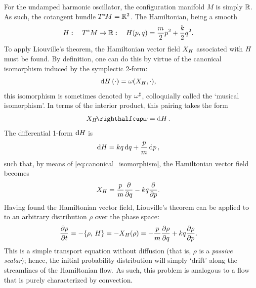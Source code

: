 For the undamped harmonic oscillator, the configuration manifold $M$ is simply $\mathbb{R}$. As such, the cotangent bundle $T^*\!M = \mathbb{R}^2$. The Hamiltonian, being a smooth
\begin{equation}
    H:\quad T^*M \to \mathbb{R}:\quad H(p, q) = \frac{m}{2}p^2 + \frac{k}{2}q^2.
\end{equation}
To apply Liouville's theorem, the Hamiltonian vector field $X_{H}$ associated with $H$ must be found. By definition, one can do this by virtue of the canonical isomorphism induced by the symplectic 2-form:
$$ \dd{\ensuremath{H}}(\cdot) = \omega(X_{H}, \cdot), $$
this isomorphism is sometimes denoted by $\omega^\sharp$, colloquially called the `musical isomorphism'. In terms of the interior product, this pairing takes the form \cite{Osborne2017,Abraham1978}
\begin{equation} 
    \intpr{X_H}{\omega} = \dd{H}.
    \label{eq:canonical_isomorphism}
\end{equation}
The differential 1-form $\dd{\ensuremath{H}}$ is
$$ \dd{\ensuremath{H}} = kq\dd{q} + \frac{p}{m}\dd{p}, $$ 
such that, by means of \cref{eq:canonical_isomorphism}, the Hamiltonian vector field becomes
$$ X_{H} =  \frac{p}{m}\pdv{}{q} - kq\pdv{}{p}. $$
Having found the Hamiltonian vector field, Liouville's theorem can be applied to to an arbitrary distribution $\rho$ over the phase space:
\begin{equation}
    \pdv{\rho}{t} = -\qty{\rho,\,H} = -X_H(\rho) = -\frac{p}{m}\pdv{\rho}{q} + kq\pdv{\rho}{p}.
    \label{eq:pde_ho}
\end{equation}
This is a simple transport equation without diffusion (that is, $\rho$ is a \emph{passive scalar}); hence, the initial probability distribution will simply `drift' along the streamlines of the Hamiltonian flow. As such, this problem is analogous to a flow that is purely characterized by convection. 

